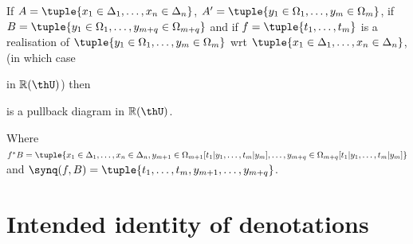   If $A = \tuple{x_1 \in \Delta_1, \dots, x_n \in \Delta_n}$, $A' = \tuple{y_1 \in \Omega_1, \dots, y_m \in \Omega_m}$, if $B = \tuple{y_1 \in \Omega_1, \dots, y_{m+q} \in \Omega_{m+q}}$ and if $f = \tuple{t_1, \dots, t_m}$ is a realisation of $\tuple{y_1 \in \Omega_1, \dots, y_m \in \Omega_m}$ wrt $\tuple{x_1 \in \Delta_1, \dots, x_n \in \Delta_n}$, (in which case
    \begin{center}
      \qquad
    \end{center}
  in $\mathbb{R}(\thU)$) then
  \begin{center}
  \end{center}
  is a pullback diagram in $\mathbb{R}(\thU)$.

  Where $f^*B = \tuple{x_1 \in \Delta_1, \dots, x_n \in \Delta_n, y_{m+1} \in \Omega_{m+1}[t_1|y_1, \dots, t_m|y_m], \dots, y_{m+q} \in \Omega_{m+q}[t_1|y_1, \dots, t_m|y_m]}$ and $\synq(f,B) = \tuple{t_1, \dots, t_m, y_{m+1}, \dots, y_{m+q}}$.

  \section{Intended identity of denotations} \label{sec:source-1-13}

